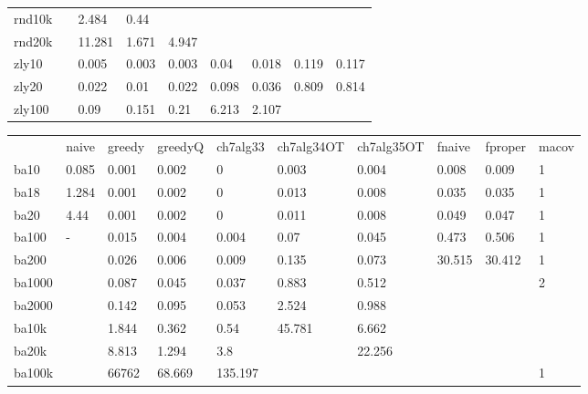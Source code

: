 \begin{table}[h]
\begin{tabular}{lllllllll}
		rnd10k  &       & 2.484  & 0.44    &          &            &            &          &         \\
		rnd20k  &       & 11.281 & 1.671   & 4.947    &            &            &          &         \\
		zly10   &       & 0.005  & 0.003   & 0.003    & 0.04       & 0.018      & 0.119    & 0.117   \\
		zly20   &       & 0.022  & 0.01    & 0.022    & 0.098      & 0.036      & 0.809    & 0.814   \\
		zly100  &       & 0.09   & 0.151   & 0.21     & 6.213      & 2.107      &          &         \\ \hline
	\end{tabular}
\end{table}

\begin{landscape}
\begin{table}[h]
\centering
	\begin{tabular}{llllllllll}
		& naive & greedy & greedyQ & ch7alg33 & ch7alg34OT & ch7alg35OT & fnaive   & fproper & macov \\
		ba10    & 0.085 & 0.001  & 0.002   & 0        & 0.003      & 0.004      & 0.008    & 0.009   & 1     \\
		ba18    & 1.284 & 0.001  & 0.002   & 0        & 0.013      & 0.008      & 0.035    & 0.035   & 1     \\
		ba20    & 4.44  & 0.001  & 0.002   & 0        & 0.011      & 0.008      & 0.049    & 0.047   & 1     \\
		ba100   & -     & 0.015  & 0.004   & 0.004    & 0.07       & 0.045      & 0.473    & 0.506   & 1     \\
		ba200   &       & 0.026  & 0.006   & 0.009    & 0.135      & 0.073      & 30.515   & 30.412  & 1     \\
		ba1000  &       & 0.087  & 0.045   & 0.037    & 0.883      & 0.512      &          &         & 2     \\
		ba2000  &       & 0.142  & 0.095   & 0.053    & 2.524      & 0.988      &          &         &       \\
		ba10k   &       & 1.844  & 0.362   & 0.54     & 45.781     & 6.662      &          &         &       \\
		ba20k   &       & 8.813  & 1.294   & 3.8      &            & 22.256     &          &         &       \\
		ba100k  &       & 66762  & 68.669  & 135.197  &            &            &          &         & 1     \\

\end{tabular}
\end{table}
\end{landscape}
